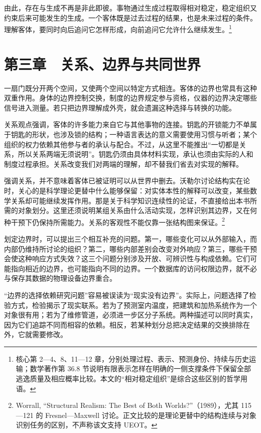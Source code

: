 \documentclass[
  11pt,
  oneside]{book}
\begin{document}
\begingroup{}

由此，存在与生成不再是非此即彼。事物通过生成过程取得相对稳定，稳定组织又约束后来可能发生的生成。一个客体既是过去过程的结果，也是未来过程的条件。理解客体，要同时向后追问它怎样形成，向前追问它允许什么继续发生。\footnote{\hypertarget{ph-note-7}{}核心第 2---4、8、11---12 章，分别处理过程、表示、预测身份、持续与历史运输；数学著作第 36.8 节说明有限表示怎样在明确的一侧支撑条件下保留全部逃逸质量及相应概率比较。本文的``相对稳定组织''是综合这些区别的哲学用语。}

\par\endgroup

\chapter{第三章　关系、边界与共同世界}\label{ph-ch-03}

一扇门既分开两个空间，又使两个空间以特定方式相连。客体的边界也常具有这种双重作用。身体的边界控制交换，制度的边界规定参与资格，仪器的边界决定哪些信号进入测量。若只把边界理解成外壳，就会遗漏这种选择与转换的功能。

关系观点强调，客体的许多能力来自它与其他事物的连接。钥匙的开锁能力不单属于钥匙的形状，也涉及锁的结构；一种语言表达的意义需要使用习惯与听者；某个组织的权力依赖其他参与者的承认与配合。不过，从这里不能推出``一切都是关系，所以关系两端无须说明''。钥匙仍须由具体材料实现，承认也须由实际的人和制度过程承担。关系改变我们对两端的理解，却不替我们省去对实现的解释。

强调关系，并不意味着客体已被证明可以从世界中删去。沃勒尔讨论结构实在论时，关心的是科学理论更替中什么能够保留：对实体本性的解释可以改变，某些数学关系却可能继续发挥作用。那是关于科学知识连续性的论证，不直接给出本书所需的对象划分。这里还须说明某组关系由什么活动实现，怎样识别其边界，又在何种干预下仍保持所需能力。关系的客观性不能仅靠一张结构图来保证。\footnote{\hypertarget{ph-note-8}{}Worrall, ``Structural Realism: The Best of Both Worlds?''（1989），尤其 115---121 的 Fresnel---Maxwell 讨论。正文比较的是理论更替中的结构连续与对象识别任务的区别，不声称该文支持 UEOT。}

划定边界时，可以提出三个相互补充的问题。第一，哪些变化可以从外部输入，而内部仍维持所讨论的组织？第二，哪些内部差别会改变对外响应？第三，哪些干预会使这种响应方式失效？这三个问题分别涉及开放、可辨识性与构成依赖。它们可能指向相近的边界，也可能指向不同的边界。一个数据库的访问权限边界，就不必与保存其数据的物理设备边界重合。

``边界的选择依赖研究问题''容易被误读为``现实没有边界''。实际上，问题选择了检验方式，检验揭示了现实联系。若为了预测室内温度，把建筑和加热系统作为一个对象很有用；若为了维修管道，必须进一步区分子系统。两种描述可以同时真实，因为它们追踪不同而相容的依赖。相反，若某种划分总把决定结果的交换排除在外，它就需要修改。
\end{document}
